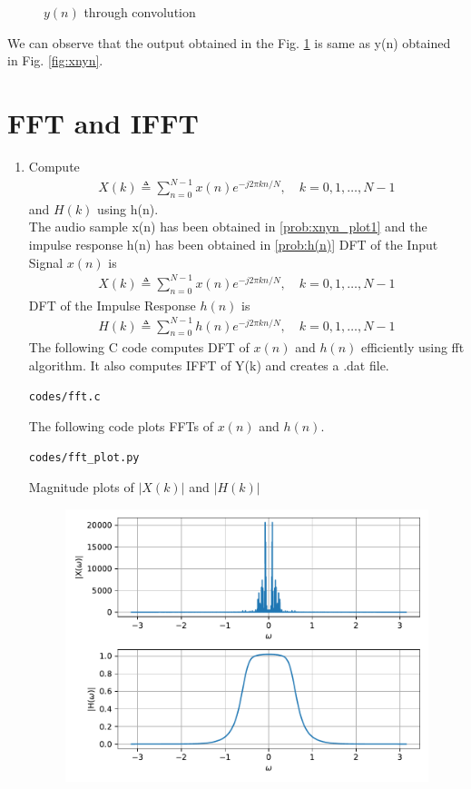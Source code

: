 \documentclass[journal,12pt,twocolumn]{IEEEtran}
\renewcommand\thesection{\arabic{section}}
\begin{document}
\begin{enumerate}[label=\thesection.\arabic*,ref=\thesection.\theenumi]
\begin{figure}[!ht]
\caption{$y(n)$ through convolution}
\label{fig:yn_conv}
\end{figure}
We can observe that the output obtained in the Fig. \ref{fig:yn_conv} is same as y(n) obtained in Fig. \ref{fig:xnyn}.
\end{enumerate}



\section{FFT and IFFT}
\begin{enumerate}[label=\thesection.\arabic*
,ref=\thesection.\theenumi]
\item Compute
\begin{align}
        X(k) \triangleq \sum_{n=0}^{N-1} x(n) e^{-j 2 \pi k n / N}, \quad k=0,1, \ldots, N-1
\end{align}
and $H(k)$ using h(n).
\\
\solution
The audio sample x(n) has been obtained in \ref{prob:xnyn_plot1} and the impulse response h(n) has been obtained in \ref{prob:h(n)} 
DFT of the Input Signal $x(n)$ is 
\begin{align}
    X(k) \triangleq \sum_{n=0}^{N-1} x(n) e^{-j 2 \pi k n / N}, \quad k=0,1, \ldots, N-1
\end{align}
DFT of the Impulse Response $h(n)$ is 
\begin{align}
    H(k) \triangleq \sum_{n=0}^{N-1} h(n) e^{-j 2 \pi k n / N}, \quad k=0,1, \ldots, N-1
\end{align}
The following C code computes DFT of $x(n)$ and $h(n)$ efficiently using fft algorithm. It also computes IFFT of Y(k) and creates a .dat file.
\begin{lstlisting}
codes/fft.c
\end{lstlisting}
The following code plots FFTs of $x(n)$ and $h(n)$.
\begin{lstlisting}
codes/fft_plot.py
\end{lstlisting}
Magnitude plots of $|X(k)|$  and  $|H(k)|$
\begin{figure}[!ht]
\centering
\includegraphics[width=\columnwidth]{./figs/fft}

\end{figure}
\end{enumerate}
\end{document}
